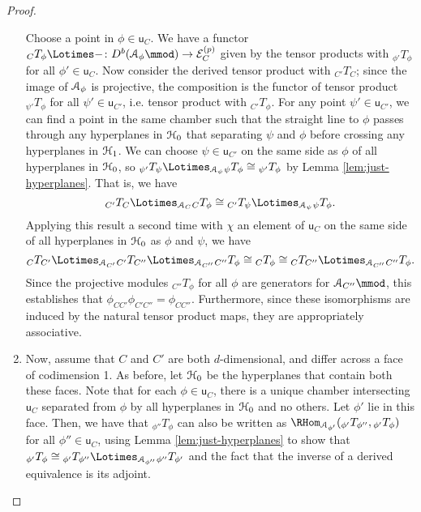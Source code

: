 \begin{proof}
\begin{enumerate}[wide]
  Choose a point in $\phi\in\mathsf{u}_C$.  We have a functor ${}_{C}T_{\phi}\Lotimes-\colon D^b(\EuScript{A}_\phi\mmod) \to \mathcal{E}_C^{(p)}$ given by the tensor products with ${}_{\phi'}T_\phi$ for all $\phi'\in\mathsf{u}_C$.  Now consider the derived tensor product with ${}_{{C'}}T_C$; since the image of $\EuScript{A}_\phi$ is projective, the composition is the functor of tensor product ${}_{\psi'}T_\phi$ for all $\psi'\in \mathsf{u}_{C'}$, i.e. tensor product with ${}_{C'}T_{\phi}$.
  For any point $\psi'\in\mathsf{u}_{C'}$, we can find a point in the same chamber such that the straight line to  $\phi$ passes through any hyperplanes in $\EuScript{H}_0$ that separating $\psi$ and $\phi$ before crossing any hyperplanes in $\EuScript{H}_1$.  We can choose $\psi\in \mathsf{u}_{C'}$ on the same side as $\phi$  of all hyperplanes in $\EuScript{H}_0$, so ${}_{\psi'}T_{\psi}\Lotimes_{\EuScript{A}_\psi}{}_{\psi}T_\phi\cong {}_{\psi'}T_{\phi}$ by Lemma \ref{lem:just-hyperplanes}.  That is, we have
  \[{}_{{C'}}T_C\Lotimes_{\EuScript{A}_C}{}_{C}T_{\phi}\cong {}_{{C'}}T_\psi\Lotimes_{\EuScript{A}_\psi}{}_{\psi}T_\phi.\]  Applying this result a second time with $\chi$ an element of $\mathsf{u}_C$ on the same side of all hyperplanes in  $\EuScript{H}_0$ as $\phi$ and $\psi$, we have
  \[{}_{C}T_{C'}\Lotimes_{\EuScript{A}_{C'}} {}_{{C'}}T_{C''}\Lotimes_{\EuScript{A}_{C''}}{}_{C''}T_{\phi}\cong {}_{C}T_\phi\cong {}_{C}T_{C''}\Lotimes_{\EuScript{A}_{C''}}{}_{C''}T_{\phi}.\]  Since the projective modules ${}_{C''}T_{\phi}$ for all $\phi$ are generators for $\EuScript{A}_{C''}\mmod$, this establishes that $\phi_{CC'}\phi_{C'C''}=\phi_{CC''}$.  Furthermore, since these isomorphisms are induced by the natural tensor product maps, they are appropriately associative.  
\item Now, assume that $C$ and ${C'}$ are both $d$-dimensional, and differ across a face of codimension 1.  As before, let $\EuScript{H}_0$ be the hyperplanes that contain both these faces.  Note that for each $\phi\in \mathsf{u}_C$, there is a unique chamber intersecting $\mathsf{u}_C$ separated from $\phi$ by all hyperplanes in $\EuScript{H}_0$ and no others.  Let  $\phi'$ lie in this face.  Then, we have that ${}_{\phi''}T_\phi$ can also be written as $\RHom_{\EuScript{A}_{\phi'}}({}_{\phi'}T_{\phi''}, {}_{\phi'}T_\phi)$ for all $\phi''\in \mathsf{u}_C$, using Lemma \ref{lem:just-hyperplanes} to show that $ {}_{\phi'}T_\phi\cong  {}_{\phi'}T_{\phi''}\Lotimes_{\EuScript{A}_{\phi''}} {}_{\phi''}T_{\phi'}$ and the fact that the inverse of a derived equivalence is its adjoint.


\end{enumerate}
\end{proof}
